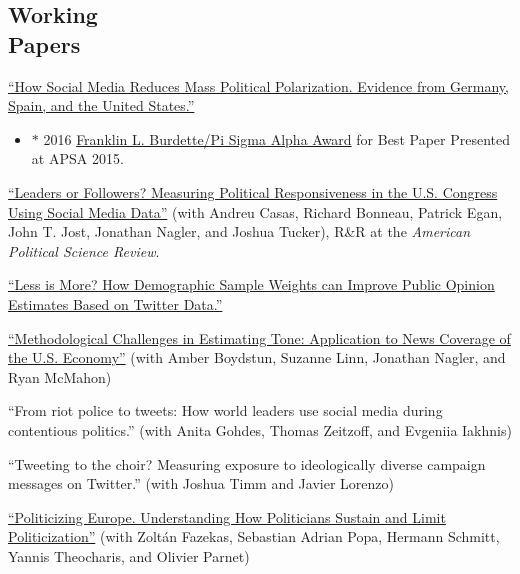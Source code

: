 \documentclass[margin,line,11pt]{resume}
\begin{document}
\begin{resume}
    \section{\mysidestyle Working\\Papers} 
    
\href{http://www.pablobarbera.com/static/barbera_polarization_APSA.pdf}{``How Social Media Reduces Mass Political Polarization. Evidence from Germany, Spain, and the United States.''} 
\begin{itemize}
\item[] $\ast$ 2016 \href{http://www.apsanet.org/PROGRAMS/APSA-Awards/Franklin-L-Burdette-Pi-Sigma-Alpha-Award}{Franklin L. Burdette/Pi Sigma Alpha Award} for Best Paper Presented at APSA 2015.
\end{itemize}

\href{http://pablobarbera.com/static/barbera_twitter_responsiveness.pdf}{``Leaders or Followers? Measuring Political Responsiveness in the U.S. Congress Using Social Media Data''} (with Andreu Casas, Richard Bonneau, Patrick Egan, John T. Jost, Jonathan Nagler, and Joshua Tucker), R\&R at the \textit{American Political Science Review}.

\href{http://pablobarbera.com/static/less-is-more.pdf}{``Less is More? How Demographic Sample Weights can Improve Public Opinion Estimates Based on Twitter Data.''}

\href{http://politics.as.nyu.edu/docs/IO/2798/econmedia_mpsa2016_methods_rvBBLMN.pdf}{``Methodological Challenges in Estimating Tone: Application to News Coverage of the U.S. Economy''} (with Amber Boydstun, Suzanne Linn, Jonathan Nagler, and Ryan McMahon)


``From riot police to tweets: How world leaders use social media during contentious politics.'' (with Anita Gohdes, Thomas Zeitzoff, and Evgeniia Iakhnis)

``Tweeting to the choir? Measuring exposure to ideologically diverse campaign messages on Twitter.'' (with Joshua Timm and Javier Lorenzo)

\href{https://zfazekas.github.io/pdfs/eupolit.pdf}{``Politicizing Europe. Understanding How Politicians Sustain and Limit Politicization''} (with Zolt\'{a}n Fazekas, Sebastian Adrian Popa, Hermann Schmitt, Yannis Theocharis, and Olivier Parnet)





\end{resume}
\end{document}

